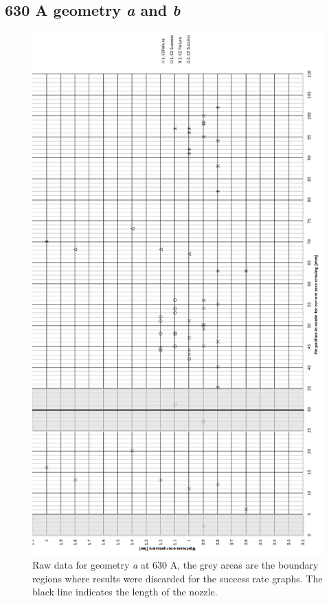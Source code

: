 \documentclass[10pt,a4paper,twoside]{article}
\begin{document}
\subsection{630 A geometry \textit{a} and \textit{b}} \label{app:testResults630A}
\begin{figure}[H]
\centering
\includegraphics[scale=0.55]{Bilder/Results/rawData630AgeoA.png}
\caption{Raw data for geometry \textit{a} at 630 A, the grey areas are the boundary regions where results were discarded for the success rate graphs. The black line indicates the length of the nozzle.} \label{fig:rawData630AgeoA}
\end{figure}
\newpage
\end{document}
